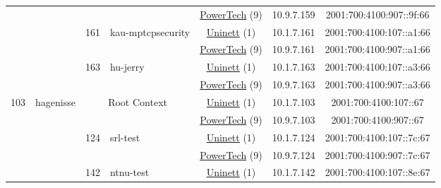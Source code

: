 \begin{small}
\begin{center}
\begin{longtable}{|c|c|c|c|c|c|c|c|}
  &  &  &  & \multicolumn{2}{|c|}{\tiny{\href{http://www.powertech.no}{PowerTech} (9)}} & \tiny{10.9.7.159} & \tiny{2001:700:4100:907::9f:66} \\* \cline{3-3}\cline{4-4}\cline{5-5}\cline{6-6}\cline{7-7}\cline{8-8}
  &  & \multirow{2}{*}{\tiny{161}} & \multicolumn{1}{|l|}{\multirow{2}{*}{\tiny{kau-mptcpsecurity}}} & \multicolumn{2}{|c|}{\tiny{\href{https://www.uninett.no}{Uninett} (1)}} & \tiny{10.1.7.161} & \tiny{2001:700:4100:107::a1:66} \\* \cline{5-5}\cline{6-6}\cline{7-7}\cline{8-8}
  &  &  &  & \multicolumn{2}{|c|}{\tiny{\href{http://www.powertech.no}{PowerTech} (9)}} & \tiny{10.9.7.161} & \tiny{2001:700:4100:907::a1:66} \\* \cline{3-3}\cline{4-4}\cline{5-5}\cline{6-6}\cline{7-7}\cline{8-8}
  &  & \multirow{2}{*}{\tiny{163}} & \multicolumn{1}{|l|}{\multirow{2}{*}{\tiny{hu-jerry}}} & \multicolumn{2}{|c|}{\tiny{\href{https://www.uninett.no}{Uninett} (1)}} & \tiny{10.1.7.163} & \tiny{2001:700:4100:107::a3:66} \\* \cline{5-5}\cline{6-6}\cline{7-7}\cline{8-8}
  &  &  &  & \multicolumn{2}{|c|}{\tiny{\href{http://www.powertech.no}{PowerTech} (9)}} & \tiny{10.9.7.163} & \tiny{2001:700:4100:907::a3:66} \\ \hline
 \multirow{20}{*}{\tiny{103}} & \multicolumn{1}{|l|}{\multirow{20}{*}{\tiny{hagenisse}}} & \multicolumn{2}{|c|}{\multirow{2}{*}{\tiny{Root Context}}} & \multicolumn{2}{|c|}{\tiny{\href{https://www.uninett.no}{Uninett} (1)}} & \tiny{10.1.7.103} & \tiny{2001:700:4100:107::67} \\* \cline{5-5}\cline{6-6}\cline{7-7}\cline{8-8}
  &  & \multicolumn{2}{|c|}{} & \multicolumn{2}{|c|}{\tiny{\href{http://www.powertech.no}{PowerTech} (9)}} & \tiny{10.9.7.103} & \tiny{2001:700:4100:907::67} \\* \cline{3-3}\cline{4-4}\cline{5-5}\cline{6-6}\cline{7-7}\cline{8-8}
  &  & \multirow{2}{*}{\tiny{124}} & \multicolumn{1}{|l|}{\multirow{2}{*}{\tiny{srl-test}}} & \multicolumn{2}{|c|}{\tiny{\href{https://www.uninett.no}{Uninett} (1)}} & \tiny{10.1.7.124} & \tiny{2001:700:4100:107::7c:67} \\* \cline{5-5}\cline{6-6}\cline{7-7}\cline{8-8}
  &  &  &  & \multicolumn{2}{|c|}{\tiny{\href{http://www.powertech.no}{PowerTech} (9)}} & \tiny{10.9.7.124} & \tiny{2001:700:4100:907::7c:67} \\* \cline{3-3}\cline{4-4}\cline{5-5}\cline{6-6}\cline{7-7}\cline{8-8}
  &  & \multirow{2}{*}{\tiny{142}} & \multicolumn{1}{|l|}{\multirow{2}{*}{\tiny{ntnu-test}}} & \multicolumn{2}{|c|}{\tiny{\href{https://www.uninett.no}{Uninett} (1)}} & \tiny{10.1.7.142} & \tiny{2001:700:4100:107::8e:67} \\* \cline{5-5}\cline{6-6}\cline{7-7}\cline{8-8}

\end{longtable}
\end{center}
\end{small}
